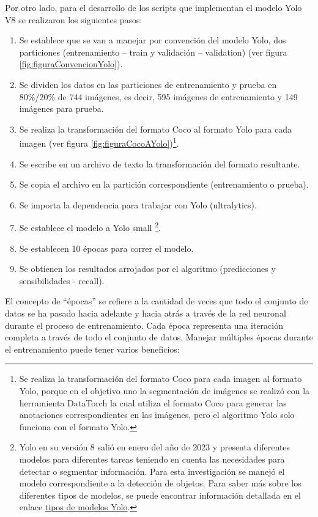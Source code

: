 Por otro lado, para el desarrollo de los scripts que implementan el modelo Yolo V8 se realizaron los siguientes pasos:

\begin{enumerate}
    \item Se establece que se van a manejar por convención del modelo Yolo, dos particiones (entrenamiento – train y validación – validation) (ver figura \ref{fig:figuraConvencionYolo}).
    \item Se dividen los datos en las particiones de entrenamiento y prueba en 80\%/20\% de 744 imágenes, es decir, 595 imágenes de entrenamiento y 149 imágenes para prueba.
    \item Se realiza la transformación del formato Coco al formato Yolo para cada imagen  (ver figura \ref{fig:figuraCocoAYolo})\footnote{Se realiza la transformación del formato Coco para cada imagen al formato Yolo, porque en el objetivo uno la segmentación de imágenes se realizó con la herramienta DataTorch la cual utiliza el formato Coco para generar las anotaciones correspondientes en las imágenes, pero el algoritmo Yolo solo funciona con el formato Yolo.}.
    \item Se escribe en un archivo de texto la transformación del formato resultante.
    \item Se copia el archivo en la partición correspondiente (entrenamiento o prueba).
    \item Se importa la dependencia para trabajar con Yolo (ultralytics).
    \item Se establece el modelo a Yolo small \footnote{Yolo en su versión 8 salió en enero del año de 2023 y presenta diferentes modelos para diferentes tareas teniendo en cuenta las necesidades para detectar o segmentar información. Para esta investigación se manejó el modelo correspondiente a la detección de objetos. Para saber más sobre los diferentes tipos de modelos, se puede encontrar información detallada en el enlace \href{https://docs.ultralytics.com/es/models/yolov8/\#tareas-y-modos-compatibles}{tipos de modelos Yolo}. }. 
    \item Se establecen 10 épocas para correr el modelo.
    \item Se obtienen los resultados arrojados por el algoritmo (predicciones y sensibilidades - recall).
\end{enumerate}

El concepto de ``épocas'' se refiere a la cantidad de veces que todo el conjunto de datos se ha pasado hacia adelante y hacia atrás a través de la red neuronal durante el proceso de entrenamiento. Cada época representa una iteración completa a través de todo el conjunto de datos.
Manejar múltiples épocas durante el entrenamiento puede tener varios beneficios: \newline

